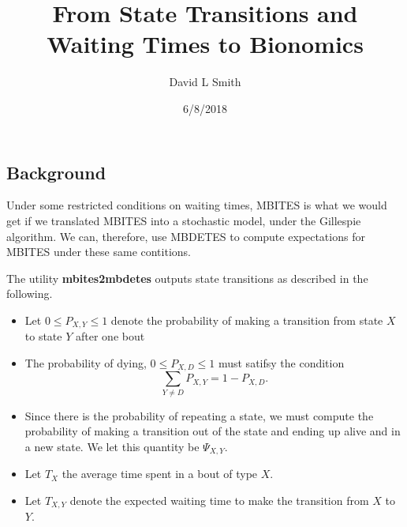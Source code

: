 \documentclass[]{article}
\title{From State Transitions and Waiting Times to Bionomics}
\author{David L Smith}
\date{6/8/2018}
\providecommand{\tightlist}{%
  \setlength{\itemsep}{0pt}\setlength{\parskip}{0pt}}
\begin{document}
\maketitle

\hypertarget{background}{%
\subsection{Background}\label{background}}

Under some restricted conditions on waiting times, MBITES is what we
would get if we translated MBITES into a stochastic model, under the
Gillespie algorithm. We can, therefore, use MBDETES to compute
expectations for MBITES under these same contitions.

The utility \textbf{mbites2mbdetes} outputs state transitions as
described in the following.

\begin{itemize}
\tightlist
\item
  Let \(0\leq P_{X,Y}\leq 1\) denote the probability of making a
  transition from state \(X\) to state \(Y\) after one bout
\item
  The probability of dying, \(0 \leq P_{X,D} \leq 1\) must satifsy the
  condition \[\sum_{Y\neq D}P_{X,Y} =1-P_{X,D}.\]
\item
  Since there is the probability of repeating a state, we must compute
  the probability of making a transition out of the state and ending up
  alive and in a new state. We let this quantity be \(\Psi_{X,Y}\).
\item
  Let \(T_{X}\) the average time spent in a bout of type \(X\).
\item
  Let \(T_{X,Y}\) denote the expected waiting time to make the
  transition from \(X\) to \(Y\).
\end{itemize}
\end{document}

